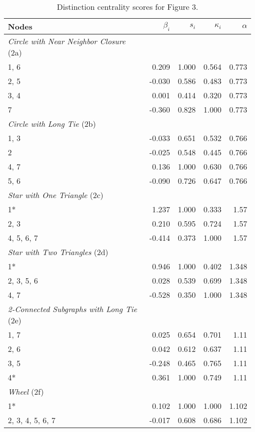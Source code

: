 \begin{table}
\footnotesize
\centering
\caption{\label{tab:star}Distinction centrality scores for Figure 3.}
\centering
\begin{tabular}[t]{lrrrr}
Nodes & $\beta_i$ & $s_i$ & $\kappa_i$ & $\alpha$\\
\toprule
\midrule
\textit{Circle with Near Neighbor Closure} (2a)\\
1, 6 & 0.209 & 1.000 & 0.564 & 0.773\\
2, 5 & -0.030 & 0.586 & 0.483 & 0.773\\
3, 4 & 0.001 & 0.414 & 0.320 & 0.773\\
7 & -0.360 & 0.828 & 1.000 & 0.773\\
\midrule
\midrule
\textit{Circle with Long Tie} (2b)\\
1, 3 & -0.033 & 0.651 & 0.532 & 0.766\\
2 & -0.025 & 0.548 & 0.445 & 0.766\\
4, 7 & 0.136 & 1.000 & 0.630 & 0.766\\
5, 6 & -0.090 & 0.726 & 0.647 & 0.766\\
\midrule
\midrule
\textit{Star with One Triangle} (2c)\\
1* & 1.237 & 1.000 & 0.333 & 1.57\\
2, 3 & 0.210 & 0.595 & 0.724 & 1.57\\
4, 5, 6, 7 & -0.414 & 0.373 & 1.000 & 1.57\\
\midrule
\midrule
\textit{Star with Two Triangles} (2d)\\
1* & 0.946 & 1.000 & 0.402 & 1.348\\
2, 3, 5, 6 & 0.028 & 0.539 & 0.699 & 1.348\\
4, 7 & -0.528 & 0.350 & 1.000 & 1.348\\
\midrule
\midrule
\textit{2-Connected Subgraphs with Long Tie} (2e)\\
1, 7 & 0.025 & 0.654 & 0.701 & 1.11\\
2, 6 & 0.042 & 0.612 & 0.637 & 1.11\\
3, 5 & -0.248 & 0.465 & 0.765 & 1.11\\
4* & 0.361 & 1.000 & 0.749 & 1.11\\
\midrule
\midrule
\textit{Wheel} (2f)\\
1* & 0.102 & 1.000 & 1.000 & 1.102\\
2, 3, 4, 5, 6, 7 & -0.017 & 0.608 & 0.686 & 1.102\\
\bottomrule
\bottomrule
\end{tabular}
\end{table}
